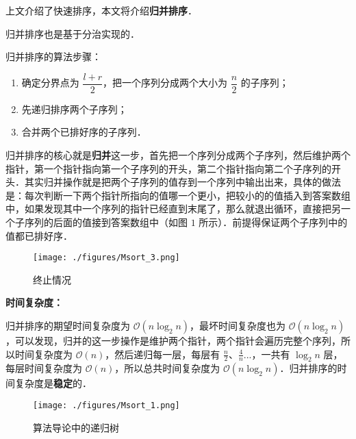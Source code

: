 
上文介绍了快速排序，本文将介绍\textbf{归并排序}．

归并排序也是基于分治实现的．

归并排序的算法步骤：
\begin{enumerate}
\item 确定分界点为 $\dfrac{l + r}{2}$，把一个序列分成两个大小为 $\dfrac{n}{2}$ 的子序列；
\item 先递归排序两个子序列；
\item 合并两个已排好序的子序列．
\end{enumerate}

归并排序的核心就是\textbf{归并}这一步，首先把一个序列分成两个子序列，然后维护两个指针，第一个指针指向第一个子序列的开头，第二个指针指向第二个子序列的开头．其实归并操作就是把两个子序列的值存到一个序列中输出出来，具体的做法是：每次判断一下两个指针所指向的值哪一个更小，把较小的的值插入到答案数组中，如果发现其中一个序列的指针已经直到末尾了，那么就退出循环，直接把另一个子序列的后面的值接到答案数组中（如图 $1$ 所示）．前提得保证两个子序列中的值都已排好序．

\begin{figure}[ht]
\centering
\texttt{[image: ./figures/Msort\_3.png]}
\caption{终止情况} \label{Msort_fig3}
\end{figure}

\textbf{时间复杂度：}

归并排序的期望时间复杂度为 $\mathcal{O}(n \log_2 n)$，最坏时间复杂度也为 $\mathcal{O}(n \log_2 n)$，可以发现，归并的这一步操作是维护两个指针，两个指针会遍历完整个序列，所以时间复杂度为 $\mathcal{O}(n)$，然后递归每一层，每层有 $\frac{n}{2}$、$\frac{4}{n}$...，一共有 $\log_2 n$ 层，每层时间复杂度为 $\mathcal{O}(n)$，所以总共时间复杂度为 $\mathcal{O}(n \log_2 n)$．归并排序的时间复杂度是\textbf{稳定}的．

\begin{figure}[ht]
\centering
\texttt{[image: ./figures/Msort\_1.png]}
\caption{算法导论中的递归树} \label{Msort_fig1}
\end{figure}

